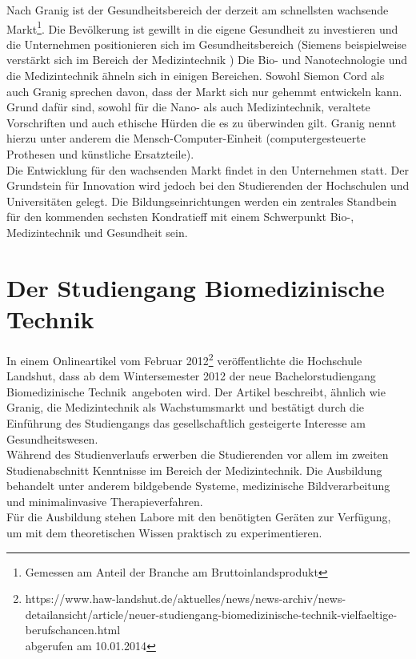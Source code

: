 Nach Granig\cite{nefiodow:gesundheit} ist der Gesundheitsbereich der derzeit am schnellsten wachsende Markt\footnote{Gemessen am Anteil der Branche am Bruttoinlandsprodukt}. Die Bevölkerung ist gewillt in die eigene Gesundheit zu investieren und die Unternehmen positionieren sich im Gesundheitsbereich (Siemens beispielweise verstärkt sich im Bereich der Medizintechnik \cite[S.111, 112]{nefiodow:gesundheit})
Die Bio- und Nanotechnologie und die Medizintechnik ähneln sich in einigen Bereichen. Sowohl Siemon Cord \cite{cord:innovation} als auch Granig \cite[Seite 116 f]{nefiodow:gesundheit} sprechen davon, dass der Markt sich nur gehemmt entwickeln kann. Grund dafür sind, sowohl für die Nano- als auch Medizintechnik, veraltete Vorschriften und auch ethische Hürden die es zu überwinden gilt. Granig nennt hierzu unter anderem die Mensch-Computer-Einheit \cite[S.117]{nefiodow:gesundheit}(computergesteuerte Prothesen und künstliche Ersatzteile).\\
Die Entwicklung für den wachsenden Markt findet in den Unternehmen statt. Der Grundstein für Innovation wird jedoch bei den Studierenden der Hochschulen und Universitäten gelegt. Die Bildungseinrichtungen werden ein zentrales Standbein für den kommenden sechsten Kondratieff mit einem Schwerpunkt Bio-, Medizintechnik und Gesundheit sein.

\FloatBarrier
\section{Der Studiengang Biomedizinische Technik}\label{einleitung:biomedTechnik}
In einem Onlineartikel vom Februar 2012\footnote{https://www.haw-landshut.de/aktuelles/news/news-archiv/news-detailansicht/article/neuer-studiengang-biomedizinische-technik-vielfaeltige-berufschancen.html \\ abgerufen am 10.01.2014} veröffentlichte die Hochschule Landshut, dass ab dem Wintersemester 2012 der neue Bachelorstudiengang \glqq Biomedizinische Technik\grqq\ angeboten wird. Der Artikel beschreibt, ähnlich wie Granig, die Medizintechnik als Wachstumsmarkt und bestätigt durch die Einführung des Studiengangs das gesellschaftlich gesteigerte Interesse am Gesundheitswesen.\\
Während des Studienverlaufs \cite{hsla:modulBMT} erwerben die Studierenden vor allem im zweiten Studienabschnitt Kenntnisse im Bereich der Medizintechnik. Die Ausbildung behandelt unter anderem bildgebende Systeme, medizinische Bildverarbeitung und minimalinvasive Therapieverfahren.\\
Für die Ausbildung stehen Labore mit den benötigten Geräten zur Verfügung, um mit dem theoretischen Wissen praktisch zu experimentieren.

